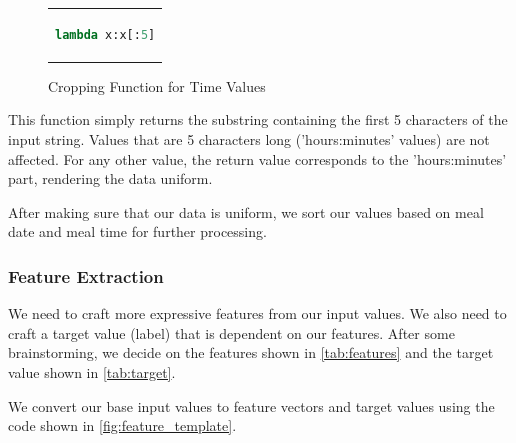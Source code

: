 \begin{figure}[htpb]
  \centering
  \begin{tabular}{c}
  \begin{lstlisting}[language=python]
lambda x:x[:5]
  \end{lstlisting}
  \end{tabular}
  \caption[Cropping Function for Time Values]{Cropping Function for Time Values}
  \label{fig:code_clean}
\end{figure}

This function simply returns the substring containing the first 5 characters of the input string.
Values that are 5 characters long ('hours:minutes' values) are not affected.
For any other value, the return value corresponds to the 'hours:minutes' part, rendering the data uniform.

After making sure that our data is uniform, we sort our values based on meal date and meal time for further processing.
\subsubsection{Feature Extraction}
We need to craft more expressive features from our input values.
We also need to craft a target value (label) that is dependent on our features.
After some brainstorming, we decide on the features shown in \autoref{tab:features} and the target value shown in \autoref{tab:target}.


We convert our base input values to feature vectors and target values using the code shown in \autoref{fig:feature_template}.


